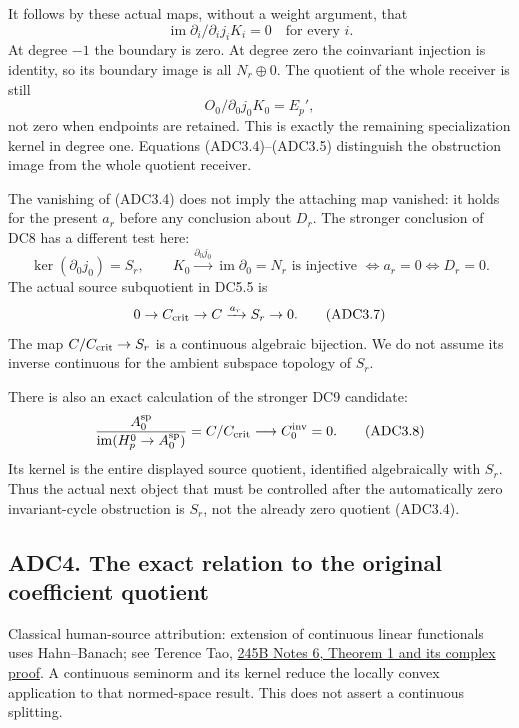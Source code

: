 It follows by these actual maps, without a weight argument, that \[
\boxed{\operatorname{im}\partial_i/\partial_i j_iK_i=0
\quad\text{for every }i.}
\tag{ADC3.4}
\] At degree \(-1\) the boundary is zero. At degree zero the coinvariant
injection is identity, so its boundary image is all \(N_r\oplus0\). The
quotient of the whole receiver is still \[
O_0/\partial_0j_0K_0=E_p',
\tag{ADC3.5}
\] not zero when endpoints are retained. This is exactly the remaining
specialization kernel in degree one. Equations (ADC3.4)--(ADC3.5)
distinguish the obstruction image from the whole quotient receiver.

The vanishing of (ADC3.4) does not imply the attaching map vanished: it
holds for the present \(a_r\) before any conclusion about \(D_r\). The
stronger conclusion of DC8 has a different test here: \[
\ker(\partial_0j_0)=S_r,\qquad
K_0\xrightarrow{\partial_0j_0}\operatorname{im}\partial_0=N_r
\text{ is injective }\Longleftrightarrow a_r=0
\Longleftrightarrow D_r=0.
\tag{ADC3.6}
\] The actual source subquotient in DC5.5 is \[
0\to C_{\rm crit}\to C\xrightarrow{a_r}S_r\to0.
\tag{ADC3.7}
\] The map \(C/C_{\rm crit}\to S_r\) is a continuous algebraic
bijection. We do not assume its inverse continuous for the ambient
subspace topology of \(S_r\).

There is also an exact calculation of the stronger DC9 candidate: \[
\frac{A_0^{\rm sp}}{\operatorname{im}(H^0_p\to A_0^{\rm sp})}
=C/C_{\rm crit}\longrightarrow C_0^{\rm inv}=0.
\tag{ADC3.8}
\] Its kernel is the entire displayed source quotient, identified
algebraically with \(S_r\). Thus the actual next object that must be
controlled after the automatically zero invariant-cycle obstruction is
\(S_r\), not the already zero quotient (ADC3.4).

\subsection{ADC4. The exact relation to the original coefficient
quotient}\label{adc4.-the-exact-relation-to-the-original-coefficient-quotient}

Classical human-source attribution: extension of continuous linear functionals uses Hahn--Banach; see Terence Tao, \href{https://terrytao.wordpress.com/2009/01/26/245b-notes-6-duality-and-the-hahn-banach-theorem/}{245B Notes 6, Theorem 1 and its complex proof}. A continuous seminorm and its kernel reduce the locally convex application to that normed-space result. This does not assert a continuous splitting.

